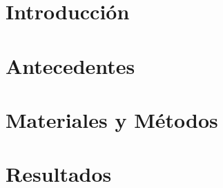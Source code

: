 \documentclass{beamer}
\title{\tituloTesis}
\author{Juan Manuel Pérez}
\begin{document}
\beamertemplatenavigationsymbolsempty


\frame{\titlepage}






\section{Introducción}



\section{Antecedentes}




\section{Materiales y Métodos}


\section{Resultados}

\end{document}
